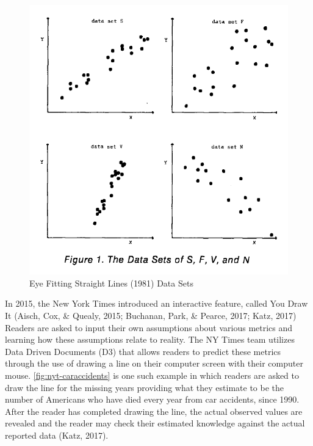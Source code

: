 \documentclass[print]{nuthesis}
\begin{document}
\begin{figure}[tbp]

{\centering \includegraphics[width=0.75\linewidth,]{images/eyefitting-straight-lines-plots} 

}

\caption{Eye Fitting Straight Lines (1981) Data Sets}\label{fig:mosteller-eyefitting-plot}
\end{figure}

In 2015, the New York Times introduced an interactive feature, called You Draw It (Aisch, Cox, \& Quealy, 2015; Buchanan, Park, \& Pearce, 2017; Katz, 2017)
Readers are asked to input their own assumptions about various metrics and learning how these assumptions relate to reality.
The NY Times team utilizes Data Driven Documents (D3) that allows readers to predict these metrics through the use of drawing a line on their computer screen with their computer mouse.
\cref{fig:nyt-caraccidents} is one such example in which readers are asked to draw the line for the missing years providing what they estimate to be the number of Americans who have died every year from car accidents, since 1990.
After the reader has completed drawing the line, the actual observed values are revealed and the reader may check their estimated knowledge against the actual reported data (Katz, 2017).
\end{document}
